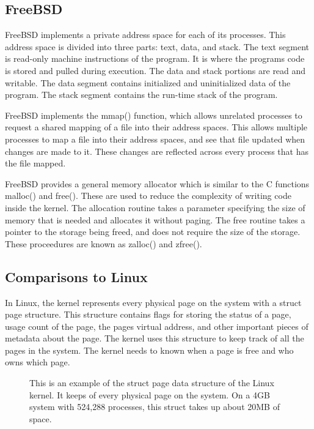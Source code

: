 \documentclass[journal,letterpaper,draftclsnofoot,onecolumn,10pt]{IEEEtran}
\begin{document}
\subsection{FreeBSD}

FreeBSD implements a private address space for each of its processes. This address space is divided into three parts: text, data, and stack. The text segment is read-only machine instructions of the program. It is where the programs code is stored and pulled during execution. The data and stack portions are read and writable. The data segment contains initialized and uninitialized data of the program. The stack segment contains the run-time stack of the program.\cite{mn15}

FreeBSD implements the mmap() function, which allows unrelated processes to request a shared mapping of a file into their address spaces. This allows multiple processes to map a file into their address spaces, and see that file updated when changes are made to it. These changes are reflected across every process that has the file mapped.\cite{mn15}

FreeBSD provides a general memory allocator which is similar to the C functions malloc() and free(). These are used to reduce the complexity of writing code inside the kernel. The allocation routine takes a parameter specifying the size of memory that is needed and allocates it without paging. The free routine takes a pointer to the storage being freed, and does not require the size of the storage. These proceedures are known as zalloc() and zfree().\cite{mn15}

\subsection{Comparisons to Linux}

In Linux, the kernel represents every physical page on the system with a struct page structure. This structure contains flags for storing the status of a page, usage count of the page, the pages virtual address, and other important pieces of metadata about the page. The kernel uses this structure to keep track of all the pages in the system. The kernel needs to known when a page is free and who owns which page.\cite{l05}

\begin{figure}[H]
   
   \caption{This is an example of the struct page data structure of the Linux kernel. It keeps of every physical page on the system. On a 4GB system with 524,288 processes, this struct takes up about 20MB of space.}
\end{figure}
\end{document}
